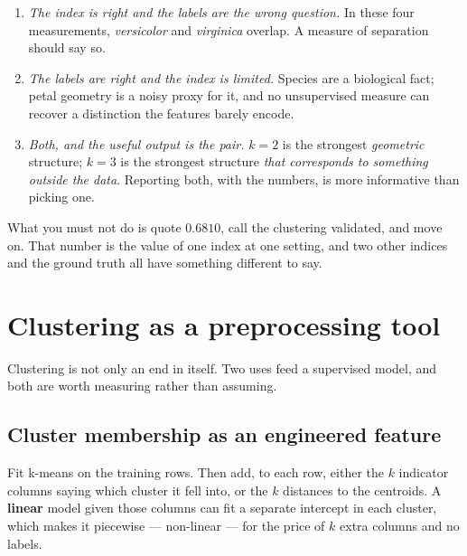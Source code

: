\documentclass[11pt]{article}
\begin{document}
\begin{enumerate}[leftmargin=*]
  \item \emph{The index is right and the labels are the wrong question.} In
    these four measurements, \emph{versicolor} and \emph{virginica} overlap.
    A measure of separation should say so.
  \item \emph{The labels are right and the index is limited.} Species are a
    biological fact; petal geometry is a noisy proxy for it, and no
    unsupervised measure can recover a distinction the features barely encode.
  \item \emph{Both, and the useful output is the pair.} $k = 2$ is the
    strongest \emph{geometric} structure; $k = 3$ is the strongest structure
    \emph{that corresponds to something outside the data}. Reporting both,
    with the numbers, is more informative than picking one.
\end{enumerate}

What you must not do is quote $0.6810$, call the clustering validated, and
move on. That number is the value of one index at one setting, and two other
indices and the ground truth all have something different to say.

\notesources{\AMLUnitVIISources}

\section{Clustering as a preprocessing tool}
\label{sec:prep}

Clustering is not only an end in itself. Two uses feed a supervised model, and
both are worth measuring rather than assuming.

\subsection{Cluster membership as an engineered feature}
\label{sec:feat}

Fit k-means on the training rows. Then add, to each row, either the $k$
indicator columns saying which cluster it fell into, or the $k$ distances to
the centroids. A \textbf{linear} model given those columns can fit a separate
intercept in each cluster, which makes it piecewise --- non-linear --- for the
price of $k$ extra columns and no labels.
\end{document}
